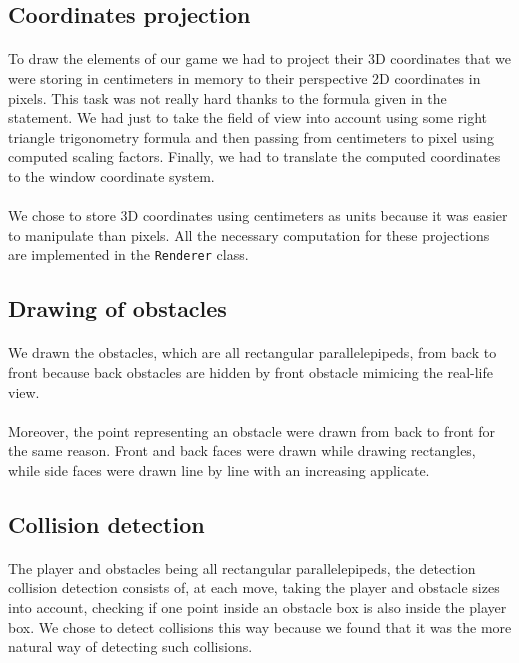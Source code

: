 \documentclass[a4paper, 11pt, oneside]{article}
\begin{document}
\subsection{Coordinates projection}
\paragraph{}To draw the elements of our game we had to project their 3D coordinates that we were storing in centimeters
in memory to their perspective 2D coordinates in pixels. This task was not really hard thanks to the formula given in 
the statement. We had just to take the field of view into account using some right triangle trigonometry formula and then passing from centimeters to pixel using computed scaling factors. Finally, we had to translate the computed coordinates to the window coordinate system.
\paragraph{}We chose to store 3D coordinates using centimeters as units because it was easier to manipulate than pixels. All the necessary computation for these projections are implemented in the \texttt{Renderer} class. 

\subsection{Drawing of obstacles}
\paragraph{}We drawn the obstacles, which are all rectangular parallelepipeds, from back to front because back obstacles are hidden by front obstacle mimicing the real-life view. 
\paragraph{}Moreover, the point representing an obstacle were drawn from back to front for the same reason. Front and back faces were drawn while drawing rectangles, while side faces were drawn line by line with an increasing applicate.

\subsection{Collision detection}
\paragraph{}The player and obstacles being all rectangular parallelepipeds, the detection collision detection consists of, at each move, taking the player and obstacle sizes into account, checking if one point inside an obstacle box is also inside the player box. We chose to detect collisions this way
because we found that it was the more natural way of detecting such collisions.
\end{document}
